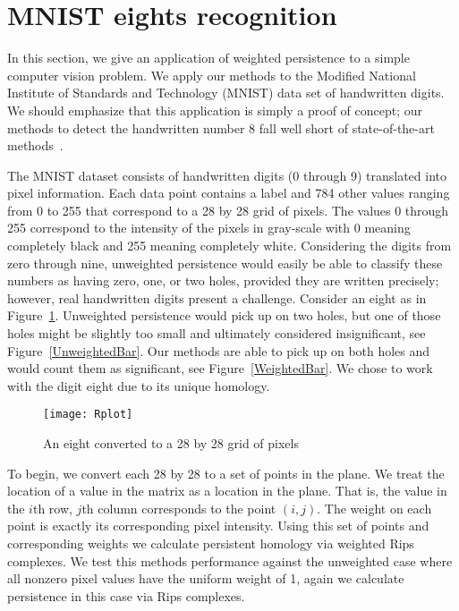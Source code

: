 \documentclass{amsart}
\newtheorem*{fibering lemma}{Fibering Lemma}
\newtheorem*{decomposition lemma}{Decomposition Lemma}
\newtheorem*{hurewicz theorem}{Hurewicz Theorem}
\theoremstyle{definition}
\begin{document}
\section{MNIST eights recognition}


In this section, we give an application of weighted persistence to a simple computer vision problem. We apply our methods to the Modified National Institute of Standards and Technology (MNIST) data set of handwritten digits. We should emphasize that this application is simply a proof of concept; our methods to detect the handwritten number 8 fall well short of state-of-the-art methods~\cite{Cir:12}.

The MNIST dataset consists of handwritten digits (0 through 9) translated into pixel information. Each data point contains a label and 784 other values ranging from 0 to 255 that correspond to a 28 by 28 grid of pixels. The values 0 through 255 correspond to the intensity of the pixels in gray-scale with 0 meaning completely black and 255 meaning completely white. Considering the digits from zero through nine, unweighted persistence would easily be able to classify these numbers as having zero, one, or two holes, provided they are written precisely; however, real handwritten digits present a challenge.  Consider an eight as in Figure~\ref{Crazy8}. Unweighted persistence would pick up on two holes, but one of those holes might be slightly too small and ultimately considered insignificant, see Figure~\ref{UnweightedBar}. Our methods are able to pick up on both holes and would count them as significant, see Figure~\ref{WeightedBar}. We chose to work with the digit eight due to its unique homology.

\begin{figure}[t]
\begin{center}
\texttt{[image: Rplot]}
\caption{An eight converted to a 28 by 28 grid of pixels}\label{Crazy8}
\end{center}
\end{figure}

To begin, we convert each 28 by 28 to a set of points in the plane. We treat the location of a value in the matrix as a location in the plane. That is, the value in the $i$th row, $j$th column corresponds to the point $(i,j)$. The weight on each point is exactly its corresponding pixel intensity. Using this set of points and corresponding weights we calculate persistent homology via weighted Rips complexes. We test this methods performance against the unweighted case where all nonzero pixel values have the uniform weight of 1, again we calculate persistence in this case via Rips complexes.
\end{document}
